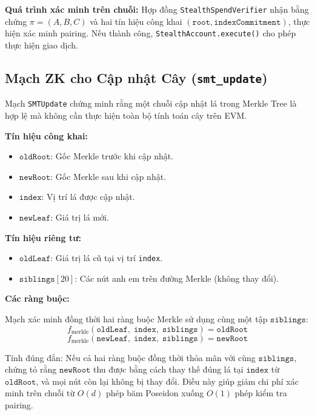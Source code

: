 \documentclass[../DoAn.tex]{subfiles}
\begin{document}
\textbf{Quá trình xác minh trên chuỗi:} Hợp đồng \texttt{StealthSpendVerifier} nhận bằng chứng \(\pi = (A, B, C)\) và hai tín hiệu công khai \((\texttt{root}, \texttt{indexCommitment})\), thực hiện xác minh pairing. Nếu thành công, \texttt{StealthAccount.execute()} cho phép thực hiện giao dịch.

\subsection{Mạch ZK cho Cập nhật Cây (\texttt{smt\_update})}
\label{subsec:zk_smt}

Mạch \texttt{SMTUpdate} chứng minh rằng một chuỗi cập nhật lá trong Merkle Tree là hợp lệ mà không cần thực hiện toàn bộ tính toán cây trên EVM.

\textbf{Tín hiệu công khai:}
\begin{itemize}
    \item \(\texttt{oldRoot}\): Gốc Merkle trước khi cập nhật.
    \item \(\texttt{newRoot}\): Gốc Merkle sau khi cập nhật.
    \item \(\texttt{index}\): Vị trí lá được cập nhật.
    \item \(\texttt{newLeaf}\): Giá trị lá mới.
\end{itemize}

\textbf{Tín hiệu riêng tư:}
\begin{itemize}
    \item \(\texttt{oldLeaf}\): Giá trị lá cũ tại vị trí \texttt{index}.
    \item \(\texttt{siblings}[20]\): Các nút anh em trên đường Merkle (không thay đổi).
\end{itemize}

\textbf{Các ràng buộc:}

Mạch xác minh đồng thời hai ràng buộc Merkle sử dụng cùng một tập \(\texttt{siblings}\):
\[
    f_{\text{merkle}}(\texttt{oldLeaf},\; \texttt{index},\; \texttt{siblings}) = \texttt{oldRoot}
\]
\[
    f_{\text{merkle}}(\texttt{newLeaf},\; \texttt{index},\; \texttt{siblings}) = \texttt{newRoot}
\]

Tính đúng đắn: Nếu cả hai ràng buộc đồng thời thỏa mãn với cùng \(\texttt{siblings}\), chứng tỏ rằng \(\texttt{newRoot}\) thu được bằng cách thay thế đúng lá tại \(\texttt{index}\) từ \(\texttt{oldRoot}\), và mọi nút còn lại không bị thay đổi. Điều này giúp giảm chi phí xác minh trên chuỗi từ \(O(d)\) phép băm Poseidon xuống \(O(1)\) phép kiểm tra pairing.

\end{document}
